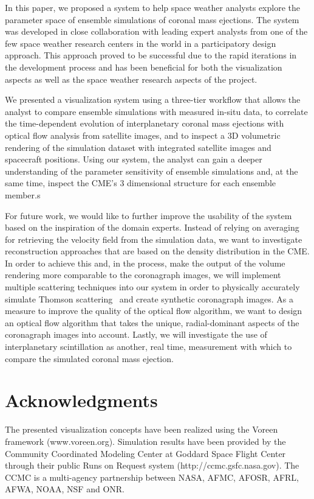 \documentclass[journal]{vgtc}                %
\begin{document}
In this paper, we proposed a system to help space weather analysts explore the parameter space of ensemble simulations of coronal mass ejections. The system was developed in close collaboration with leading expert analysts from one of the few space weather research centers in the world in a participatory design approach. This approach proved to be successful due to the rapid iterations in the development process and has been beneficial for both the visualization aspects as well as the space weather research aspects of the project.

We presented a visualization system using a three-tier workflow that allows the analyst to compare ensemble simulations with measured in-situ data, to correlate the time-dependent evolution of interplanetary coronal mass ejections with optical flow analysis from satellite images, and to inspect a 3D volumetric rendering of the simulation dataset with integrated satellite images and spacecraft positions. Using our system, the analyst can gain a deeper understanding of the parameter sensitivity of ensemble simulations and, at the same time, inspect the CME's 3 dimensional structure for each ensemble member.s

For future work, we would like to further improve the usability of the system based on the inspiration of the domain experts. Instead of relying on averaging for retrieving the velocity field from the simulation data, we want to investigate reconstruction approaches that are based on the density distribution in the CME. In order to achieve this and, in the process, make the output of the volume rendering more comparable to the coronagraph images, we will implement multiple scattering techniques into our system in order to physically accurately simulate Thomson scattering~\cite{howard2012thomson} and create synthetic coronagraph images. As a measure to improve the quality of the optical flow algorithm, we want to design an optical flow algorithm that takes the unique, radial-dominant aspects of the coronagraph images into account. Lastly, we will investigate the use of interplanetary scintillation as another, real time, measurement with which to compare the simulated coronal mass ejection.

\section*{Acknowledgments}
The presented visualization concepts have been realized using the Voreen framework (www.voreen.org). Simulation results have been provided by the Community Coordinated Modeling Center at Goddard Space Flight Center through their public Runs on Request system (http://ccmc.gsfc.nasa.gov). The CCMC is a multi-agency partnership between NASA, AFMC, AFOSR, AFRL, AFWA, NOAA, NSF and ONR.



\end{document}
